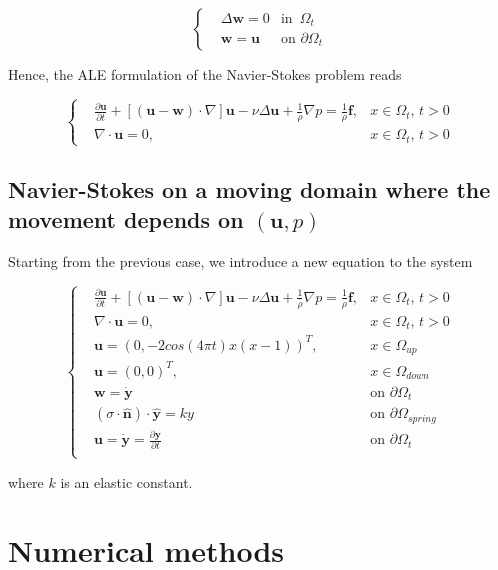 \documentclass[11pt,a4paper,titlepage]{report}
\begin{document}
\[
\left\{  
\begin{aligned}
& \Delta \mathbf{w} = 0 	& \text{in } \, \Omega_t \\
& \mathbf{w} = \mathbf{u} 				& \text{on } \partial \Omega_t
\end{aligned}
\right.
\]

Hence, the ALE formulation of the Navier-Stokes problem reads

\[
\left\{  
\begin{aligned}
&\frac{\partial \mathbf{u}}{\partial t} + [(\mathbf{u - w}) \cdot \nabla] \mathbf{u} - \nu \Delta \mathbf{u} + \frac{1}{\rho} \nabla p = \frac{1}{\rho} \mathbf{f},  & x \in \Omega_t, \, t>0 \\
& \nabla \cdot \mathbf{u} = 0, & x \in \Omega_t, \, t>0
\end{aligned}
\right.
\]

\section{Navier-Stokes on a moving domain where the movement depends on $(\mathbf{u},p)$}

Starting from the previous case, we introduce a new equation to the system 

\[
\left\{  
\begin{aligned}
&\frac{\partial \mathbf{u}}{\partial t} + [(\mathbf{u - w}) \cdot \nabla] \mathbf{u} - \nu \Delta \mathbf{u} + \frac{1}{\rho} \nabla p = \frac{1}{\rho} \mathbf{f},  & x \in \Omega_t, \, t>0 \\
& \nabla \cdot \mathbf{u} = 0, & x \in \Omega_t, \, t>0 \\
& \mathbf{u} = (0, -2cos(4 \pi t) x(x-1) )^T, & x \in \Omega_{up} \\
& \mathbf{u} = (0,0)^T, & x \in \Omega_{down} \\
& \mathbf{w} = \dot{\mathbf{y}} & \text{on } \partial \Omega_t \\
& (\sigma \cdot \hat{\mathbf{n}}) \cdot \hat{\mathbf{y}} = ky & \text{on } \partial \Omega_{spring} \\
& \mathbf{u} = \dot{\mathbf{y}} = \frac{\partial \mathbf{y}}{\partial t}  & \text{on } \partial \Omega_{t} \\
\end{aligned}
\right.
\]

where $k$ is an elastic constant. 


\chapter{Numerical methods}
\end{document}

